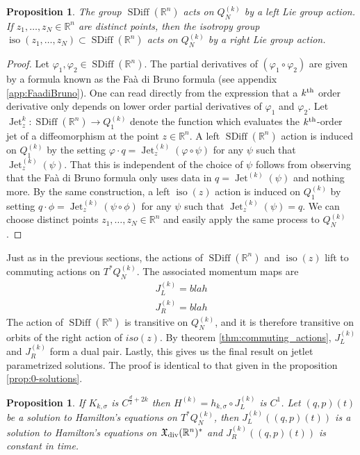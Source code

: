 \documentclass[12pt]{amsart}
\newcommand{\R}{\ensuremath{\mathbb{R}}}
\newtheorem{prop}[thm]{Proposition}
\DeclareMathOperator{\SDiff}{SDiff}
\DeclareMathOperator{\Jet}{Jet}
\DeclareMathOperator{\iso}{iso}
\begin{document}
  \begin{prop}
    The group $\SDiff(\R^n)$ acts on $Q_N^{(k)}$ by a left Lie group
    action.  If $z_1 ,\dots,z_N \in \R^n$ are distinct points,
    then the isotropy group $\iso(z_1,\dots,z_N) \subset \SDiff(\R^n)$
    acts on $Q_N^{(k)}$ by a right Lie group action.
  \end{prop}
  \begin{proof}
    Let $\varphi_1,\varphi_2 \in \SDiff(\R^n)$.
    The partial derivatives of $(\varphi_1 \circ \varphi_2)$
    are given by a formula known as the Fa\`a di Bruno formula
    (see appendix \ref{app:FaadiBruno}).
    One can read directly from the expression that
    a $k^{\rm th}$ order derivative only depends on lower order
    partial derivatives of $\varphi_1$ and $\varphi_2$.
    Let $\Jet^k_z: \SDiff(\R^n) \to Q_1^{(k)}$ denote
    the function which evaluates the $k^{\rm th}$-order
    jet of a diffeomorphism at the point $z \in \R^n$.
    A left $\SDiff(\R^n)$ action is induced on $Q_1^{(k)}$ by
    the setting $\varphi \cdot q = \Jet_z^{(k)}( \varphi \circ \psi)$
    for any $\psi$ such that $\Jet^{(k)}_z(\psi)$.
    That this is independent of the choice of $\psi$ follows
    from observing that the Fa\`a di Bruno formula
    only uses data in $q = \Jet^{(k)}(\psi)$ and nothing more.
    By the same construction, a left $\iso(z)$ action is induced
    on $Q_1^{(k)}$ by setting $q \cdot \phi = \Jet^{(k)}_z ( \psi \circ \phi)$ for any $\psi$ such that $\Jet_z^{(k)}(\psi) = q$.
    We can choose distinct points $z_1,\dots,z_N \in \R^n$
    and easily apply the same process to $Q_N^{(k)}$.
  \end{proof}
  
  Just as in the previous sections, the actions of $\SDiff(\R^n)$ and $\iso(z)$ lift to commuting actions on $T^*Q_N^{(k)}$.
  The associated momentum maps are
  \begin{align*}
    J_L^{(k)} = blah \\
    J_R^{(k)} = blah
  \end{align*}
  The action of $\SDiff(\R^n)$ is transitive on $Q_N^{(k)}$,
  and it is therefore transitive on orbits of the right action of $iso(z)$.
  By theorem \ref{thm:commuting_actions}, $J_L^{(k)}$ and $J_R^{(k)}$ form a dual pair.
  Lastly, this gives us the final result on jetlet parametrized solutions.
  The proof is identical to that given in the proposition \ref{prop:0-solutions}.
  \begin{prop}
  	If $K_{k,\sigma}$ is $C^{\frac{d}{2} + 2k}$ then $H^{(k)} = h_{k,\sigma} \circ J_L^{(k)}$
	is $C^1$.
        Let $(q,p)(t)$ be a solution to Hamilton's equations on 
        $T^*Q^{(k)}_N$, then $J_L^{(k)}( (q,p)(t))$ is a solution to Hamilton's
        equations on $\mathfrak{X}_{\rm div}(\R^n)^*$
        and $J_R^{(k)}( (q,p)(t))$ is constant in time.
  \end{prop}
  
\end{document}
